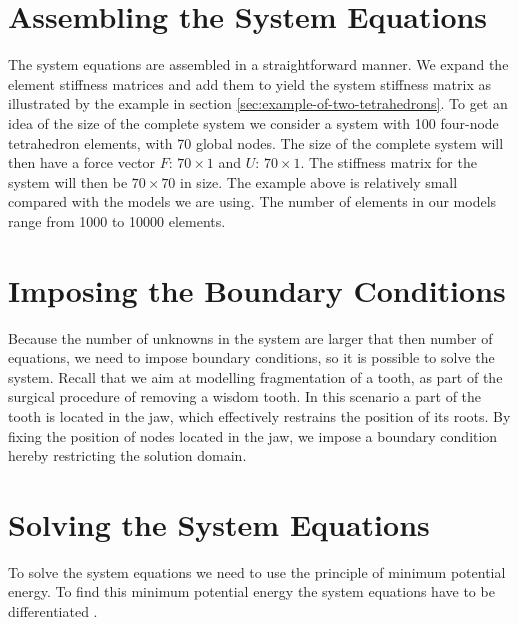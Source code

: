 \section{Assembling the System Equations}
The system equations are assembled in a straightforward manner. We
expand the element stiffness matrices and add them to yield the system
stiffness matrix as illustrated by the example in section
\vref{sec:example-of-two-tetrahedrons}.
To get an idea of the size of the complete system we consider a system
with 100 four-node tetrahedron elements, with 70 global nodes. The size
of the complete system will then have a force vector $F$: $70 \times
1$ and $U$: $70 \times 1$. The stiffness matrix for the system will
then be $70 \times 70$ in size.
%
The example above is relatively small compared with the models we are
using. The number of elements in our models range from 1000 to 10000
elements.
%


\section{Imposing the Boundary Conditions}
Because the number of unknowns in the system are larger that then
number of equations, we need to impose boundary conditions, so it is
possible to solve the system.
%
Recall that we aim at modelling fragmentation of a tooth, as part of
the surgical procedure of removing a wisdom tooth. In this scenario 
a part of the tooth is located in the jaw, which effectively restrains
the position of its roots.
%
By fixing the position of nodes located in the jaw, we impose a
boundary condition hereby restricting the solution domain.

\section{Solving the System Equations}
To solve the system equations we need to use the principle of minimum
potential energy. To find this minimum potential energy the system
equations have to be differentiated .



